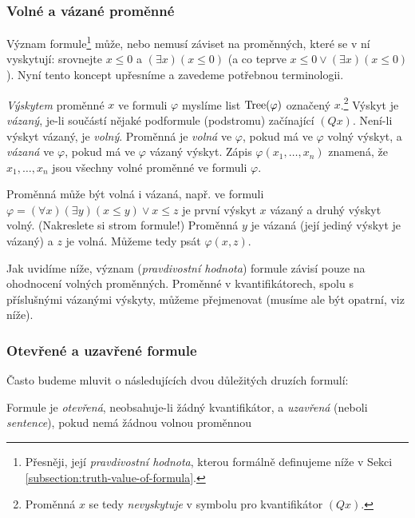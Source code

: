 \subsubsection{Volné a vázané proměnné}

Význam formule\footnote{Přesněji, její \emph{pravdivostní hodnota}, kterou formálně definujeme níže v Sekci \ref{subsection:truth-value-of-formula}.} může, nebo nemusí záviset na proměnných, které se v ní vyskytují: srovnejte $x\leq 0$ a $(\exists x)(x\leq 0)$ (a co teprve $x\leq 0 \lor (\exists x)(x\leq 0)$). Nyní tento koncept upřesníme a zavedeme potřebnou terminologii.


\emph{Výskytem} proměnné $x$ ve formuli $\varphi$ myslíme list $\operatorname{Tree}(\varphi)$ označený $x$.\footnote{Proměnná $x$ se tedy \emph{nevyskytuje} v symbolu pro kvantifikátor $(Qx)$.} Výskyt je \emph{vázaný}, je-li součástí nějaké podformule (podstromu) začínající $(Qx)$. Není-li výskyt vázaný, je \emph{volný}. Proměnná je \emph{volná} ve $\varphi$, pokud má ve $\varphi$ volný výskyt, a \emph{vázaná} ve $\varphi$, pokud má ve $\varphi$ vázaný výskyt. Zápis $\varphi(x_1,\dots,x_n)$ znamená, že $x_1,\dots,x_n$ jsou všechny volné proměnné ve formuli $\varphi$.

\begin{example}
    Proměnná může být volná i vázaná, např. ve formuli $\varphi=(\forall x)(\exists y)(x\leq y)\lor x\leq z$ je první výskyt $x$ vázaný a druhý výskyt volný. (Nakreslete si strom formule!) Proměnná $y$ je vázaná (její jediný výskyt je vázaný) a $z$ je volná. Můžeme tedy psát $\varphi(x,z)$.
\end{example}

\begin{remark}
    Jak uvidíme níže, význam (\emph{pravdivostní hodnota}) formule závisí pouze na ohodnocení volných proměnných. Proměnné v kvantifikátorech, spolu s příslušnými vázanými výskyty, můžeme přejmenovat (musíme ale být opatrní, viz níže).   
\end{remark}

\subsubsection{Otevřené a uzavřené formule}

Často budeme mluvit o následujících dvou důležitých druzích formulí:

\begin{definition}
Formule je \emph{otevřená}, neobsahuje-li žádný kvantifikátor, a \emph{uzavřená} (neboli \emph{sentence}), pokud nemá žádnou volnou proměnnou  
\end{definition}


